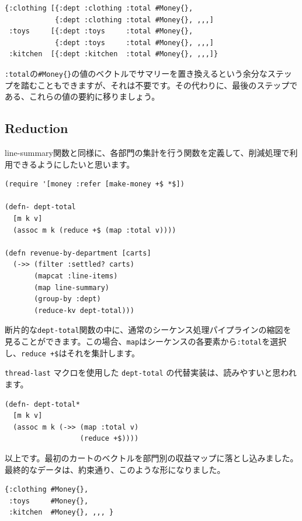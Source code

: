 \begin{lstlisting}[numbers=none]
{:clothing [{:dept :clothing :total #Money{},
            {:dept :clothing :total #Money{}, ,,,]
 :toys     [{:dept :toys     :total #Money{},
            {:dept :toys     :total #Money{}, ,,,]
 :kitchen  [{:dept :kitchen  :total #Money{}, ,,,]}
\end{lstlisting}

\texttt{:total}の\texttt{\#Money\{\}}の値のベクトルでサマリーを置き換えるという余分なステップを踏むこともできますが、それは不要です。その代わりに、最後のステップである、これらの値の要約に移りましょう。

\subsection{Reduction}

line-summary関数と同様に、各部門の集計を行う関数を定義して、削減処理で利用できるようにしたいと思います。


\begin{lstlisting}[numbers=none]
(require '[money :refer [make-money +$ *$])

(defn- dept-total
  [m k v]
  (assoc m k (reduce +$ (map :total v))))

(defn revenue-by-department [carts]
  (->> (filter :settled? carts)
       (mapcat :line-items)
       (map line-summary)
       (group-by :dept)
       (reduce-kv dept-total)))
\end{lstlisting}

断片的な\texttt{dept-total}関数の中に、通常のシーケンス処理パイプラインの縮図を見ることができます。この場合、\texttt{map}はシーケンスの各要素から\texttt{:total}を選択し、\texttt{reduce +\$}はそれを集計します。

\texttt{thread-last} マクロを使用した \texttt{dept-total} の代替実装は、読みやすいと思われます。


\begin{lstlisting}[numbers=none]
(defn- dept-total*
  [m k v]
  (assoc m k (->> (map :total v)
                  (reduce +$))))
\end{lstlisting}

以上です。最初のカートのベクトルを部門別の収益マップに落とし込みました。最終的なデータは、約束通り、このような形になりました。


\begin{lstlisting}[numbers=none]
{:clothing #Money{},
 :toys     #Money{},
 :kitchen  #Money{}, ,,, }
\end{lstlisting}

